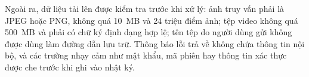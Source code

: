 Ngoài ra, dữ liệu tải lên được kiểm tra trước khi xử lý: ảnh truy vấn phải là JPEG hoặc PNG, không quá 10~MB và 24 triệu điểm ảnh; tệp video không quá 500~MB và phải có chữ ký định dạng hợp lệ; tên tệp do người dùng gửi không được dùng làm đường dẫn lưu trữ. Thông báo lỗi trả về không chứa thông tin nội bộ, và các trường nhạy cảm như mật khẩu, mã phiên hay thông tin xác thực được che trước khi ghi vào nhật ký.
